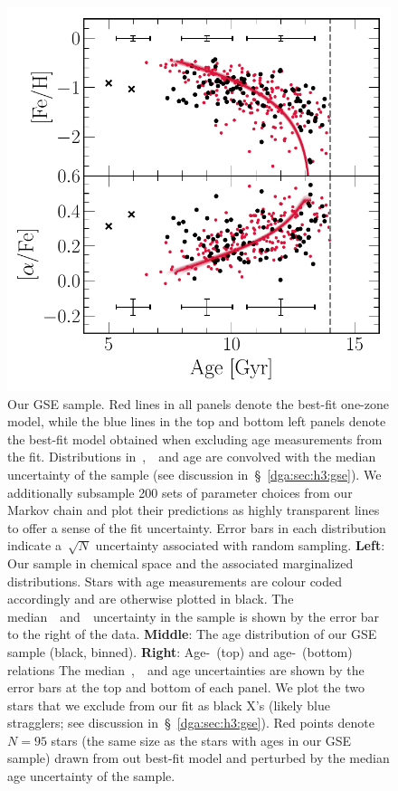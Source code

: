 {\begin{landscape}
\begin{figure}
\includegraphics[scale = 0.47]{gsefit_amr.pdf}
\caption{
Our GSE sample.
Red lines in all panels denote the best-fit one-zone model, while the
blue lines in the top and bottom left panels denote the best-fit model obtained
when excluding age measurements from the fit.
Distributions in~\feh,~\afe~and age are convolved with the median uncertainty
of the sample (see discussion in~\S~\ref{dga:sec:h3:gse}).
We additionally subsample 200 sets of parameter choices from our Markov chain
and plot their predictions as highly transparent lines to offer a sense of the
fit uncertainty.
Error bars in each distribution indicate a~$\sqrt{N}$ uncertainty associated
with random sampling.
\textbf{Left}: Our sample in chemical space and the associated marginalized
distributions.
Stars with age measurements are colour coded accordingly and are otherwise
plotted in black.
The median~\feh~and~\afe~uncertainty in the sample is shown by the error bar
to the right of the data.
\textbf{Middle}: The age distribution of our GSE sample (black,
binned).
\textbf{Right}: Age-\feh~(top) and age-\afe~(bottom) relations
The median~\feh,~\afe~and age uncertainties are shown by the error bars at the
top and bottom of each panel.
We plot the two stars that we exclude from our fit as black X's (likely
blue stragglers; see discussion in~\S~\ref{dga:sec:h3:gse}).
Red points denote~$N = 95$ stars (the same size as the stars with ages in our
GSE sample) drawn from out best-fit model and perturbed by the median age
uncertainty of the sample.
}
\label{dga:fig:gse}
\end{figure}
\end{landscape}
\clearpage
}

